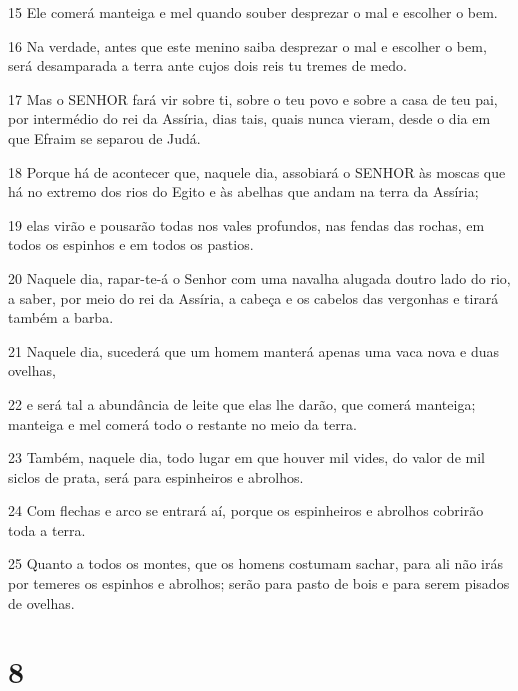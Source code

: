 \par 15 Ele comerá manteiga e mel quando souber desprezar o mal e escolher o bem.
\par 16 Na verdade, antes que este menino saiba desprezar o mal e escolher o bem, será desamparada a terra ante cujos dois reis tu tremes de medo.
\par 17 Mas o SENHOR fará vir sobre ti, sobre o teu povo e sobre a casa de teu pai, por intermédio do rei da Assíria, dias tais, quais nunca vieram, desde o dia em que Efraim se separou de Judá.
\par 18 Porque há de acontecer que, naquele dia, assobiará o SENHOR às moscas que há no extremo dos rios do Egito e às abelhas que andam na terra da Assíria;
\par 19 elas virão e pousarão todas nos vales profundos, nas fendas das rochas, em todos os espinhos e em todos os pastios.
\par 20 Naquele dia, rapar-te-á o Senhor com uma navalha alugada doutro lado do rio, a saber, por meio do rei da Assíria, a cabeça e os cabelos das vergonhas e tirará também a barba.
\par 21 Naquele dia, sucederá que um homem manterá apenas uma vaca nova e duas ovelhas,
\par 22 e será tal a abundância de leite que elas lhe darão, que comerá manteiga; manteiga e mel comerá todo o restante no meio da terra.
\par 23 Também, naquele dia, todo lugar em que houver mil vides, do valor de mil siclos de prata, será para espinheiros e abrolhos.
\par 24 Com flechas e arco se entrará aí, porque os espinheiros e abrolhos cobrirão toda a terra.
\par 25 Quanto a todos os montes, que os homens costumam sachar, para ali não irás por temeres os espinhos e abrolhos; serão para pasto de bois e para serem pisados de ovelhas.

\chapter{8}

